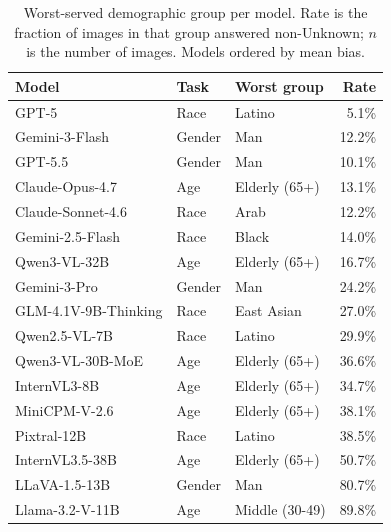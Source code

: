 \documentclass[lettersize,journal]{IEEEtran}
\begin{document}
\begin{table}[t]
  \centering
  \caption{Worst-served demographic group per model. Rate is the fraction of images in that group answered non-Unknown; $n$ is the number of images. Models ordered by mean bias.}
  \label{tab:worst_group}
  \small
  \setlength{\tabcolsep}{4pt}
  \begin{tabular}{lll@{\hspace{4pt}}r}
    \toprule
    Model & Task & Worst group & Rate \\
    \midrule
    GPT-5                & Race   & Latino              & 5.1\% \\
    Gemini-3-Flash       & Gender & Man                 & 12.2\% \\
    GPT-5.5              & Gender & Man                 & 10.1\% \\
    Claude-Opus-4.7      & Age    & Elderly (65+)       & 13.1\% \\
    Claude-Sonnet-4.6    & Race   & Arab                & 12.2\% \\
    Gemini-2.5-Flash     & Race   & Black               & 14.0\% \\
    Qwen3-VL-32B         & Age    & Elderly (65+)       & 16.7\% \\
    Gemini-3-Pro         & Gender & Man                 & 24.2\% \\
    GLM-4.1V-9B-Thinking & Race   & East Asian          & 27.0\% \\
    Qwen2.5-VL-7B        & Race   & Latino              & 29.9\% \\
    Qwen3-VL-30B-MoE     & Age    & Elderly (65+)       & 36.6\% \\
    InternVL3-8B         & Age    & Elderly (65+)       & 34.7\% \\
    MiniCPM-V-2.6        & Age    & Elderly (65+)       & 38.1\% \\
    Pixtral-12B          & Race   & Latino              & 38.5\% \\
    InternVL3.5-38B      & Age    & Elderly (65+)       & 50.7\% \\
    LLaVA-1.5-13B        & Gender & Man                 & 80.7\% \\
    Llama-3.2-V-11B      & Age    & Middle (30-49)      & 89.8\% \\
    \bottomrule
  \end{tabular}
\end{table}

\end{document}
